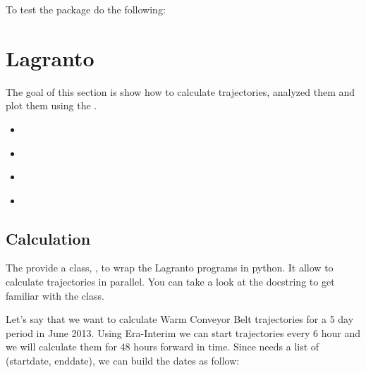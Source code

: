 \documentclass[a4paper,10pt,english]{sphinxmanual}
\begin{document}
To test the package do the following:

\begin{sphinxVerbatim}[commandchars=\\\{\}]
 
\end{sphinxVerbatim}


\chapter{Lagranto}
\label{\detokenize{tutorial_lagranto:lagranto}}\label{\detokenize{tutorial_lagranto::doc}}\label{\detokenize{tutorial_lagranto:virtualenvwrapper}}
The goal of this section is show how to calculate trajectories, analyzed them and plot them using the {\hyperref[\detokenize{lagranto:lagranto-package}]{}}.
\begin{itemize}
\item {} 
{\hyperref[\detokenize{tutorial_lagranto:calculation}]{}}

\item {} 
{\hyperref[\detokenize{tutorial_lagranto:analyze}]{}}

\item {} 
{\hyperref[\detokenize{tutorial_lagranto:plotting}]{}}

\item {} 
{\hyperref[\detokenize{tutorial_lagranto:writing}]{}}

\end{itemize}


\section{Calculation}
\label{\detokenize{tutorial_lagranto:calculation}}
The {\hyperref[\detokenize{lagranto:lagranto-package}]{}} provide a class, {\hyperref[\detokenize{lagranto:lagranto.LagrantoRun}]{}}, to wrap the Lagranto programs in python. It allow to calculate trajectories in parallel. You can take a look at the docstring to get familiar with the class.

Let’s say that we want to calculate Warm Conveyor Belt trajectories for a 5 day period in June 2013.
Using Era-Interim we can start trajectories every 6 hour and we will calculate them for 48 hours forward in time. Since {\hyperref[\detokenize{lagranto:lagranto.LagrantoRun}]{}} needs a list of (startdate, enddate), we can build the dates as follow:
\end{document}
